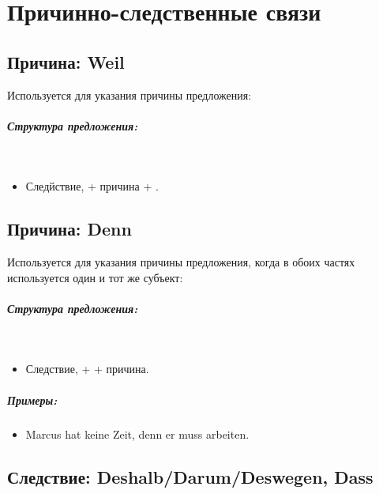 \chapter{Причинно-следственные связи}

\section{Причина: Weil}

Используется для указания причины предложения: 

\paragraph{Структура предложения:} ~\\
\begin{itemize}
\item Следйствие,  + причина + \dverb{}.
\end{itemize}

\section{Причина: Denn}

Используется для указания причины предложения, когда в обоих частях используется один и тот же субъект: 

\paragraph{Структура предложения:} ~\\
\begin{itemize}
\item Следствие,  + \dverb + причина.
\end{itemize}

\paragraph{Примеры:}
\begin{itemize}
\item Marcus hat keine Zeit, denn er muss arbeiten.
~\\ 
\end{itemize}

\section{Следствие: Deshalb/Darum/Deswegen, Dass}

